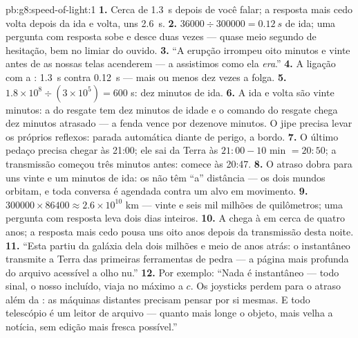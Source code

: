 \begin{solution}{pb:g8:speed-of-light:1}
\textbf{1.} Cerca de \qty{1.3}{s} depois de você falar; a resposta
mais cedo volta depois da ida e volta, uns \qty{2.6}{s}.
\textbf{2.} $36000 \div 300000 = \qty{0.12}{s}$ de ida; uma pergunta
com resposta sobe e desce duas vezes --- quase meio segundo de
hesitação, bem no limiar do ouvido.
\textbf{3.} ``A erupção irrompeu oito minutos e vinte antes de as
nossas telas acenderem ---  a assistimos como ela \emph{era}.''
\textbf{4.} A ligação com a : \qty{1.3}{s} contra \qty{0.12}{s}
--- mais ou menos dez vezes a folga.
\textbf{5.} $1.8 \times 10^{8} \div (3 \times 10^{5}) = 600$ s: dez
minutos de ida.
\textbf{6.} A ida e volta são vinte minutos: a  do resgate tem
dez minutos de idade e o comando do resgate chega dez minutos
atrasado --- a fenda vence por dezenove minutos. O jipe precisa levar
os próprios reflexos: parada automática diante de perigo, a bordo.
\textbf{7.} O último pedaço precisa chegar às 21:00; ele sai da Terra
às $21{:}00 - 10$ min $= 20{:}50$; a transmissão começou três minutos
antes: comece às 20:47.
\textbf{8.} O atraso dobra para uns vinte e um minutos de ida: os
 não têm ``a'' distância --- os dois mundos orbitam, e toda
conversa é agendada contra um alvo em movimento.
\textbf{9.} $300000 \times 86400 \approx 2.6 \times 10^{10}$ km ---
vinte e seis mil milhões de quilômetros; uma pergunta com resposta
leva dois dias inteiros.
\textbf{10.} A  chega à  em cerca de quatro anos; a
resposta mais cedo pousa uns oito anos depois da transmissão desta
noite.
\textbf{11.} ``Esta  partiu da galáxia dela dois milhões e meio de
anos atrás: o instantâneo transmite a Terra das primeiras ferramentas
de pedra --- a página mais profunda do arquivo acessível a olho nu.''
\textbf{12.} Por exemplo: ``Nada é instantâneo --- todo sinal, o
nosso incluído, viaja no máximo a $c$. Os joysticks perdem para o
atraso além da : as máquinas distantes precisam pensar por si
mesmas. E todo telescópio é um leitor de arquivo --- quanto mais
longe o objeto, mais velha a notícia, sem edição mais fresca
possível.''
\end{solution}
